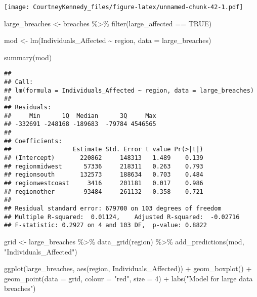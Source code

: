 \documentclass[
]{article}
\newenvironment{Shaded}{\begin{snugshade}}{\end{snugshade}}
\newcommand{\AttributeTok}[1]{\textcolor[rgb]{0.77,0.63,0.00}{#1}}
\newcommand{\ConstantTok}[1]{\textcolor[rgb]{0.00,0.00,0.00}{#1}}
\newcommand{\DecValTok}[1]{\textcolor[rgb]{0.00,0.00,0.81}{#1}}
\newcommand{\FunctionTok}[1]{\textcolor[rgb]{0.00,0.00,0.00}{#1}}
\newcommand{\NormalTok}[1]{#1}
\newcommand{\OtherTok}[1]{\textcolor[rgb]{0.56,0.35,0.01}{#1}}
\newcommand{\SpecialCharTok}[1]{\textcolor[rgb]{0.00,0.00,0.00}{#1}}
\newcommand{\StringTok}[1]{\textcolor[rgb]{0.31,0.60,0.02}{#1}}
\begin{document}
\texttt{[image: CourtneyKennedy\_files/figure-latex/unnamed-chunk-42-1.pdf]}

\begin{Shaded}
\begin{Highlighting}[]
\NormalTok{large\_breaches }\OtherTok{\textless{}{-}}\NormalTok{ breaches }\SpecialCharTok{\%\textgreater{}\%}
  \FunctionTok{filter}\NormalTok{(large\_affected }\SpecialCharTok{==} \ConstantTok{TRUE}\NormalTok{)}

\NormalTok{mod }\OtherTok{\textless{}{-}} \FunctionTok{lm}\NormalTok{(Individuals\_Affected }\SpecialCharTok{\textasciitilde{}}\NormalTok{ region, }\AttributeTok{data =}\NormalTok{ large\_breaches)}

\FunctionTok{summary}\NormalTok{(mod)}
\end{Highlighting}
\end{Shaded}

\begin{verbatim}
## 
## Call:
## lm(formula = Individuals_Affected ~ region, data = large_breaches)
## 
## Residuals:
##     Min      1Q  Median      3Q     Max 
## -332691 -248168 -189683  -79784 4546565 
## 
## Coefficients:
##                 Estimate Std. Error t value Pr(>|t|)
## (Intercept)       220862     148313   1.489    0.139
## regionmidwest      57336     218311   0.263    0.793
## regionsouth       132573     188634   0.703    0.484
## regionwestcoast     3416     201181   0.017    0.986
## regionother       -93484     261132  -0.358    0.721
## 
## Residual standard error: 679700 on 103 degrees of freedom
## Multiple R-squared:  0.01124,    Adjusted R-squared:  -0.02716 
## F-statistic: 0.2927 on 4 and 103 DF,  p-value: 0.8822
\end{verbatim}

\begin{Shaded}
\begin{Highlighting}[]
\NormalTok{grid }\OtherTok{\textless{}{-}}\NormalTok{ large\_breaches }\SpecialCharTok{\%\textgreater{}\%}
  \FunctionTok{data\_grid}\NormalTok{(region) }\SpecialCharTok{\%\textgreater{}\%}
  \FunctionTok{add\_predictions}\NormalTok{(mod, }\StringTok{"Individuals\_Affected"}\NormalTok{)}

\FunctionTok{ggplot}\NormalTok{(large\_breaches, }\FunctionTok{aes}\NormalTok{(region, Individuals\_Affected)) }\SpecialCharTok{+}
  \FunctionTok{geom\_boxplot}\NormalTok{() }\SpecialCharTok{+}
  \FunctionTok{geom\_point}\NormalTok{(}\AttributeTok{data =}\NormalTok{ grid, }\AttributeTok{colour =} \StringTok{"red"}\NormalTok{, }\AttributeTok{size =} \DecValTok{4}\NormalTok{) }\SpecialCharTok{+}
  \FunctionTok{labs}\NormalTok{(}\StringTok{"Model for large data breaches"}\NormalTok{)}
\end{Highlighting}
\end{Shaded}
\end{document}
